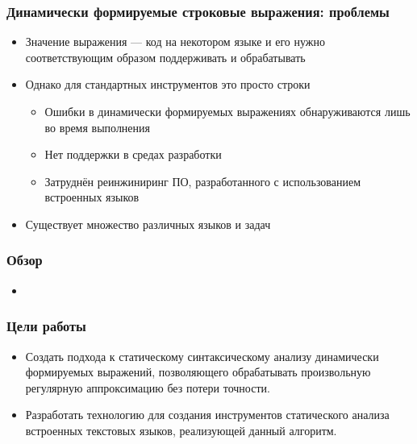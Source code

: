 \documentclass{beamer}
\begin{document}
\begin{frame}
    \transwipe[direction=90]
    \frametitle{Динамически формируемые строковые выражения: проблемы}
    \begin{itemize}
        \item Значение выражения --- код на некотором языке и его нужно соответствующим образом поддерживать и обрабатывать
        \item Однако для стандартных инструментов это просто строки
        \begin{itemize}
            \item Ошибки в динамически формируемых выражениях обнаруживаются лишь во время выполнения
            \item Нет поддержки в средах разработки
            \item Затруднён реинжиниринг ПО, разработанного с использованием встроенных языков                
        \end{itemize}
        \item Существует множество различных языков и задач
    \end{itemize}
\end{frame}

\begin{frame}
    \transwipe[direction=90]
    \frametitle{Обзор}
    \begin{itemize}
        \item
    \end{itemize}
\end{frame}

\begin{frame}
    \transwipe[direction=90]
    \frametitle{Цели работы}
    \begin{itemize}
        \item Создать подхода к статическому синтаксическому анализу динамически формируемых выражений, позволяющего обрабатывать произвольную регулярную аппроксимацию без потери точности.
        \item Разработать технологию для создания инструментов статического анализа встроенных текстовых языков, реализующей данный алгоритм.
    \end{itemize}
\end{frame}
\end{document}
